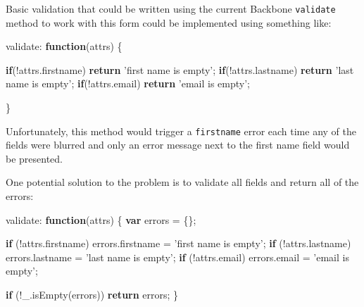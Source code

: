 \documentclass[9pt]{book}
\newenvironment{Shaded}{}{}
\newcommand{\KeywordTok}[1]{\textcolor[rgb]{0.00,0.44,0.13}{\textbf{{#1}}}}
\newcommand{\StringTok}[1]{\textcolor[rgb]{0.25,0.44,0.63}{{#1}}}
\newcommand{\OtherTok}[1]{\textcolor[rgb]{0.00,0.44,0.13}{{#1}}}
\newcommand{\FunctionTok}[1]{\textcolor[rgb]{0.02,0.16,0.49}{{#1}}}
\newcommand{\NormalTok}[1]{{#1}}
\begin{document}
Basic validation that could be written using the current Backbone
\texttt{validate} method to work with this form could be implemented
using something like:

\begin{Shaded}
\begin{Highlighting}[]
\NormalTok{validate: }\KeywordTok{function}\NormalTok{(attrs) \{}

    \KeywordTok{if}\NormalTok{(!}\OtherTok{attrs}\NormalTok{.}\FunctionTok{firstname}\NormalTok{) }\KeywordTok{return} \StringTok{'first name is empty'}\NormalTok{;}
    \KeywordTok{if}\NormalTok{(!}\OtherTok{attrs}\NormalTok{.}\FunctionTok{lastname}\NormalTok{) }\KeywordTok{return} \StringTok{'last name is empty'}\NormalTok{;}
    \KeywordTok{if}\NormalTok{(!}\OtherTok{attrs}\NormalTok{.}\FunctionTok{email}\NormalTok{) }\KeywordTok{return} \StringTok{'email is empty'}\NormalTok{;}

\NormalTok{\}}
\end{Highlighting}
\end{Shaded}

Unfortunately, this method would trigger a \texttt{firstname} error each
time any of the fields were blurred and only an error message next to
the first name field would be presented.

One potential solution to the problem is to validate all fields and
return all of the errors:

\begin{Shaded}
\begin{Highlighting}[]
\NormalTok{validate: }\KeywordTok{function}\NormalTok{(attrs) \{}
  \KeywordTok{var} \NormalTok{errors = \{\};}

  \KeywordTok{if} \NormalTok{(!}\OtherTok{attrs}\NormalTok{.}\FunctionTok{firstname}\NormalTok{) }\OtherTok{errors}\NormalTok{.}\FunctionTok{firstname} \NormalTok{= }\StringTok{'first name is empty'}\NormalTok{;}
  \KeywordTok{if} \NormalTok{(!}\OtherTok{attrs}\NormalTok{.}\FunctionTok{lastname}\NormalTok{) }\OtherTok{errors}\NormalTok{.}\FunctionTok{lastname} \NormalTok{= }\StringTok{'last name is empty'}\NormalTok{;}
  \KeywordTok{if} \NormalTok{(!}\OtherTok{attrs}\NormalTok{.}\FunctionTok{email}\NormalTok{) }\OtherTok{errors}\NormalTok{.}\FunctionTok{email} \NormalTok{= }\StringTok{'email is empty'}\NormalTok{;}

  \KeywordTok{if} \NormalTok{(!}\OtherTok{_}\NormalTok{.}\FunctionTok{isEmpty}\NormalTok{(errors)) }\KeywordTok{return} \NormalTok{errors;}
\NormalTok{\}}
\end{Highlighting}
\end{Shaded}
\end{document}
